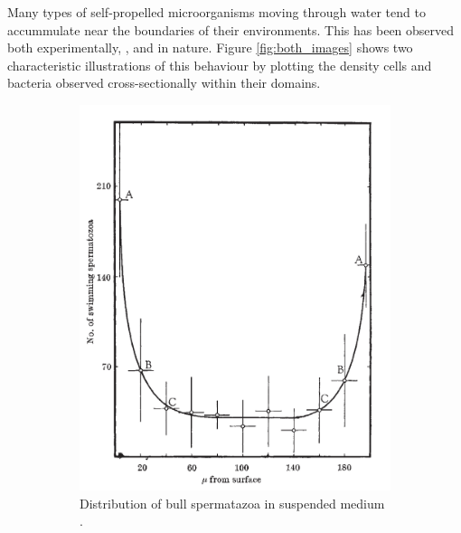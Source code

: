 Many types of self-propelled microorganisms moving through water tend to accummulate near the boundaries
of their environments. This has been observed both experimentally, \cite{rothschild1963non}, 
\cite{berke2008hydrodynamic} and in nature. Figure \ref{fig:both_images} shows two characteristic
illustrations of this behaviour by plotting the density cells and bacteria observed cross-sectionally 
within their domains.

\begin{figure}[htbp]\label{fig: intro_distributions}
    \centering
    \begin{subfigure}[b]{0.45\textwidth}
      \centering
      \includegraphics[width=\textwidth]{graphics/bull_spermatazoa_ distribution.png}
      \caption{Distribution of bull spermatazoa in suspended medium \cite{rothschild1963non}.}
      \label{fig:image1}
    \end{subfigure}
    \hfill
    \begin{subfigure}[b]{0.45\textwidth}
      \centering

\end{subfigure}
\end{figure}
